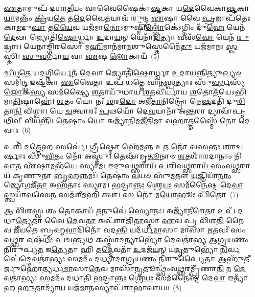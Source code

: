 \-\ul{𑌏}\-𑌤𑌾𑌮𑍁𑌪᳴ 𑌦𑌧𑌾\-\ul{𑌤𑍀}\-𑌯𑌂 𑌵𑌾𑌵𑍈𑌷𑍈𑌕𑌾॑\-\ul{𑌷𑍍𑌟}\-𑌕𑌾 𑌯\-\ul{𑌦𑍇}\-𑌵𑍈𑌕𑌾॑\-\ul{𑌷𑍍𑌟}\-𑌕𑌾\-\ul{𑌯𑌾}\-𑌮𑌨𑍍𑌨𑌂᳴ \ul{𑌕𑍍𑌰𑌿}\-𑌯\-\ul{𑌤𑍇} 𑌤\-\ul{𑌦𑍇}\-𑌵𑍈𑌤𑌯𑌾𑌵᳴ 𑌰𑍁𑌨𑍍𑌦𑍍𑌧 \ul{𑌏}\-𑌷𑌾 𑌵𑍈 \ul{𑌪𑍍𑌰}\-𑌜𑌾𑌪᳴𑌤𑍇𑌃 𑌕𑌾\-\ul{𑌮}\-𑌦𑍁\-\ul{𑌘𑌾} 𑌤\-\ul{𑌯𑍈}\-𑌵 𑌯𑌜᳴𑌮𑌾\-\ul{𑌨𑍋}\-\-𑌽𑌮𑍁𑌷𑍍𑌮𑌿᳴\-\ul{𑌲𑍍𑌲𑍋𑌁}\-𑌕𑍇॑\-𑌽𑌗𑍍𑌨𑌿𑌂 𑌦𑍁᳴\-\ul{𑌹𑍇} 𑌯𑍇𑌨᳴ \ul{𑌦𑍇}\-𑌵𑌾 𑌜𑍍𑌯𑍋𑌤𑌿᳴\-\ul{𑌷𑍋}\-𑌰𑍍𑌧𑍍𑌵𑌾 \ul{𑌉}\-𑌦𑌾\-\ul{𑌯}\-𑌨𑍍 𑌯𑍇𑌨𑌾᳴\-\ul{𑌦𑌿}\-𑌤𑍍𑌯𑌾 𑌵𑌸᳴\-\ul{𑌵𑍋} 𑌯𑍇𑌨᳴ \ul{𑌰𑍁}\-𑌦𑍍𑌰𑌾𑌃। 𑌯𑍇𑌨𑌾𑌙𑍍𑌗𑌿᳴𑌰𑌸𑍋 𑌮\-\ul{𑌹𑌿}\-𑌮𑌾𑌨᳴𑌮𑌾\-\ul{𑌨}\-𑌶𑍁𑌸𑍍𑌤𑍇𑌨𑍈᳴\-\ul{𑌤𑍁} 𑌯𑌜᳴𑌮𑌾𑌨𑌃 \ul{𑌸𑍍𑌵}\-𑌸𑍍𑌤𑌿। \ul{𑌸𑍁}\-\-\ul{𑌵}\-𑌰𑍍𑌗𑌾\-\ul{𑌯} 𑌵𑌾 \ul{𑌏}\-𑌷 \ul{𑌲𑍋}\-𑌕𑌾𑌯᳴~(5)

\-\ul{𑌚𑍀}\-\-\ul{𑌯}\-\-\ul{𑌤𑍇} 𑌯\-\ul{𑌦}\-𑌗𑍍𑌨𑌿𑌰𑍍𑌯𑍇𑌨᳴ \ul{𑌦𑍇}\-𑌵𑌾 𑌜𑍍𑌯𑍋𑌤𑌿᳴\-\ul{𑌷𑍋}\-𑌰𑍍𑌧𑍍𑌵𑌾 \ul{𑌉}\-𑌦𑌾\-\ul{𑌯}\-𑌨𑍍𑌨𑌿𑌤𑍍𑌯𑍁\-\ul{𑌖𑍍𑌯}\-\-\ul{𑍞} 𑌸𑌮𑌿᳴\-\ul{𑌨𑍍𑌦𑍍𑌧} 𑌇𑌷𑍍𑌟᳴𑌕𑌾 \ul{𑌏}\-𑌵𑍈𑌤𑌾 𑌉𑌪᳴ 𑌧𑌤𑍍𑌤𑍇 𑌵𑌾𑌨\-\ul{𑌸𑍍𑌪}\-𑌤𑍍𑌯𑌾𑌃 𑌸𑍁᳴\-\ul{𑌵}\-𑌰𑍍𑌗𑌸𑍍𑌯᳴ \ul{𑌲𑍋}\-𑌕\-\ul{𑌸𑍍𑌯} 𑌸𑌮᳴𑌷𑍍𑌟𑍍𑌯𑍈 \ul{𑌶}\-𑌤𑌾𑌯𑍁᳴𑌧𑌾𑌯 \ul{𑌶}\-𑌤𑌵𑍀॑𑌰𑍍𑌯𑌾𑌯 \ul{𑌶}\-𑌤𑍋𑌤᳴𑌯𑍇\-𑌽𑌭𑌿𑌮𑌾\-\ul{𑌤𑌿}\-𑌷𑌾𑌹𑍇॑। \ul{𑌶}\-𑌤𑌂 𑌯𑍋 𑌨𑌃᳴ \ul{𑌶}\-𑌰\-\ul{𑌦𑍋} 𑌅𑌜𑍀᳴\-\ul{𑌤𑌾}\-𑌨𑌿𑌨𑍍𑌦𑍍𑌰𑍋᳴ 𑌨𑍇\-\ul{𑌷}\-𑌦𑌤𑌿᳴ 𑌦𑍁\-\ul{𑌰𑌿}\-𑌤𑌾\-\ul{𑌨𑌿} 𑌵𑌿𑌶𑍍𑌵𑌾॑। 𑌯𑍇 \ul{𑌚}\-𑌤𑍍𑌵𑌾𑌰𑌃᳴ \ul{𑌪}\-𑌥𑌯𑍋᳴ 𑌦𑍇\-\ul{𑌵}\-𑌯𑌾𑌨𑌾᳴ 𑌅\-\ul{𑌨𑍍𑌤}\-𑌰𑌾 𑌦𑍍𑌯𑌾𑌵𑌾᳴𑌪𑍃\-\ul{𑌥𑌿}\-𑌵𑍀 \ul{𑌵𑌿}\-𑌯𑌨𑍍𑌤𑌿᳴। 𑌤𑍇\-\ul{𑌷𑌾𑌂} 𑌯𑍋 𑌅𑌜𑍍𑌯𑌾᳴\-\ul{𑌨𑌿}\-𑌮𑌜𑍀᳴𑌤𑌿\-\ul{𑌮𑌾} 𑌵\-\ul{𑌹𑌾}\-𑌤𑍍𑌤𑌸𑍍𑌮𑍈᳴ 𑌨𑍋 𑌦𑍇𑌵𑌾𑌃~(6)

𑌪𑌰𑌿᳴ 𑌦\-\ul{𑌤𑍍𑌤𑍇}\-𑌹 𑌸𑌰𑍍𑌵𑍇॑। \ul{𑌗𑍍𑌰𑍀}\-𑌷𑍍𑌮𑍋 𑌹𑍇᳴\-\ul{𑌮}\-𑌨𑍍𑌤 \ul{𑌉}\-𑌤 𑌨𑍋᳴ 𑌵\-\ul{𑌸}\-𑌨𑍍𑌤𑌃 \ul{𑌶}\-𑌰\-\ul{𑌦𑍍𑌵}\-𑌰𑍍\mbox{}𑌷𑌾𑌃 𑌸𑍁᳴\-\ul{𑌵𑌿}\-𑌤𑌂 𑌨𑍋᳴ 𑌅𑌸𑍍𑌤𑍁। 𑌤𑍇𑌷𑌾᳴𑌮𑍃\-\ul{𑌤𑍂}\-𑌨𑌾𑍞 \ul{𑌶}\-𑌤𑌶𑌾᳴𑌰𑌦𑌾𑌨𑌾𑌂 𑌨𑌿\-\ul{𑌵𑌾}\-𑌤 𑌏᳴\-\ul{𑌷𑌾}\-𑌮𑌭᳴𑌯𑍇 𑌸𑍍𑌯𑌾𑌮। \ul{𑌇}\-\-\ul{𑌦𑍁}\-\-\ul{𑌵}\-\-\ul{𑌥𑍍𑌸}\-𑌰𑌾𑌯᳴ 𑌪𑌰𑌿𑌵\-\ul{𑌥𑍍𑌸}\-𑌰𑌾𑌯᳴ 𑌸𑌂𑌵\-\ul{𑌥𑍍𑌸}\-𑌰𑌾𑌯᳴ 𑌕𑍃𑌣𑍁𑌤𑌾 \ul{𑌬𑍃}\-𑌹𑌨𑍍𑌨𑌮𑌃᳴। 𑌤𑍇𑌷𑌾𑌂॑ \ul{𑌵}\-𑌯𑍞 𑌸𑍁᳴\-\ul{𑌮}\-𑌤𑍗 \ul{𑌯}\-𑌜𑍍𑌞𑌿𑌯𑌾᳴\-\ul{𑌨𑌾𑌂} 𑌜𑍍𑌯𑍋𑌗𑌜𑍀᳴\-\ul{𑌤𑌾} 𑌅𑌹᳴𑌤𑌾𑌃 𑌸𑍍𑌯𑌾𑌮। \ul{𑌭}\-𑌦𑍍𑌰𑌾\-\ul{𑌨𑍍𑌨𑌃} 𑌶𑍍𑌰𑍇\-\ul{𑌯𑌃} 𑌸𑌮᳴𑌨𑍈𑌷𑍍𑌟 𑌦𑍇\-\ul{𑌵𑌾}\-𑌸𑍍𑌤𑍍𑌵𑌯𑌾᳴\-\ul{𑌵}\-𑌸𑍇\-\ul{𑌨} 𑌸𑌮᳴𑌶𑍀𑌮𑌹𑌿 𑌤𑍍𑌵𑌾। 𑌸 𑌨𑍋᳴ 𑌮\-\ul{𑌯𑍋}\-𑌭𑍂𑌃 𑌪𑌿᳴𑌤𑍋~(7)

𑌆 𑌵𑌿᳴𑌶\-\ul{𑌸𑍍𑌵} 𑌶𑌂 \ul{𑌤𑍋}\-𑌕𑌾𑌯᳴ \ul{𑌤}\-𑌨𑍁𑌵𑍇॑ \ul{𑌸𑍍𑌯𑍋}\-𑌨𑌃। 𑌅𑌜𑍍𑌯𑌾᳴𑌨𑍀\-\ul{𑌰𑍇}\-𑌤𑌾 𑌉𑌪᳴ 𑌦𑌧𑌾\-\ul{𑌤𑍍𑌯𑍇}\-𑌤𑌾 𑌵𑍈 \ul{𑌦𑍇}\-𑌵\-\ul{𑌤𑌾} 𑌅𑌪᳴𑌰𑌾𑌜𑌿\-\ul{𑌤𑌾}\-𑌸𑍍𑌤𑌾 \ul{𑌏}\-𑌵 𑌪𑍍𑌰 𑌵𑌿᳴𑌶\-\ul{𑌤𑌿} 𑌨𑍈𑌵 𑌜𑍀᳴𑌯𑌤𑍇 𑌬𑍍𑌰𑌹𑍍𑌮\-\ul{𑌵𑌾}\-𑌦𑌿𑌨𑍋᳴ 𑌵𑌦\-\ul{𑌨𑍍𑌤𑌿} 𑌯𑌦᳴𑌰𑍍𑌧\-\ul{𑌮𑌾}\-𑌸𑌾 𑌮𑌾𑌸𑌾᳴ \ul{𑌋}\-𑌤𑌵𑌃᳴ 𑌸𑌂𑌵\-\ul{𑌥𑍍𑌸}\-𑌰 𑌓𑌷᳴\-\ul{𑌧𑍀𑌃} 𑌪\-\ul{𑌚}\-𑌨𑍍𑌤𑍍𑌯\-\ul{𑌥} 𑌕𑌸𑍍𑌮𑌾᳴\-\ul{𑌦}\-𑌨𑍍𑌯𑌾𑌭𑍍𑌯𑍋᳴ \ul{𑌦𑍇}\-𑌵𑌤𑌾॑𑌭𑍍𑌯 𑌆𑌗𑍍𑌰\-\ul{𑌯}\-𑌣𑌂 𑌨𑌿𑌰𑍁᳴𑌪𑍍𑌯\-\ul{𑌤} 𑌇\-\ul{𑌤𑍍𑌯𑍇}\-𑌤𑌾 𑌹𑌿 𑌤\-\ul{𑌦𑍍𑌦𑍇}\-𑌵𑌤𑌾᳴ \ul{𑌉}\-𑌦𑌜᳴\-\ul{𑌯}\-𑌨𑍍 𑌯\-\ul{𑌦𑍃}\-𑌤𑍁𑌭𑍍𑌯𑍋᳴ \ul{𑌨𑌿}\-𑌰𑍍𑌵𑌪𑍇॑\-\ul{𑌦𑍍𑌦𑍇}\-𑌵𑌤𑌾॑𑌭𑍍𑌯𑌃 \ul{𑌸}\-𑌮𑌦𑌂᳴ 𑌦𑌧𑍍𑌯𑌾𑌦𑌾𑌗𑍍𑌰\-\ul{𑌯}\-𑌣𑌂 \ul{𑌨𑌿}\-𑌰𑍁\-\ul{𑌪𑍍𑌯𑍈}\-𑌤𑌾 𑌆𑌹𑍁᳴𑌤𑍀𑌰𑍍𑌜𑍁𑌹𑍋𑌤𑍍𑌯𑌰𑍍𑌧\-\ul{𑌮𑌾}\-𑌸𑌾\-\ul{𑌨𑍇}\-𑌵 𑌮𑌾𑌸𑌾᳴\-\ul{𑌨𑍃}\-𑌤𑍂𑌨𑍍𑌥𑍍𑌸𑌂᳴𑌵\-\ul{𑌥𑍍𑌸}\-𑌰𑌮𑍍𑌪𑍍𑌰𑍀᳴𑌣𑌾\-\ul{𑌤𑌿} 𑌨 \ul{𑌦𑍇}\-𑌵𑌤𑌾॑𑌭𑍍𑌯𑌃 \ul{𑌸}\-𑌮𑌦𑌂᳴ 𑌦𑌧𑌾𑌤𑌿 \ul{𑌭}\-𑌦𑍍𑌰𑌾\-\ul{𑌨𑍍𑌨𑌃} 𑌶𑍍𑌰𑍇\-\ul{𑌯𑌃} 𑌸𑌮᳴𑌨𑍈𑌷𑍍𑌟 𑌦𑍇\-\ul{𑌵𑌾} 𑌇𑌤𑍍𑌯𑌾᳴𑌹 \ul{𑌹𑍁}\-𑌤𑌾𑌦𑍍𑌯𑌾᳴\-\ul{𑌯} 𑌯𑌜᳴𑌮𑌾\-\ul{𑌨}\-𑌸𑍍𑌯𑌾𑌪᳴𑌰𑌾𑌭𑌾𑌵𑌾𑌯॥~(8)

